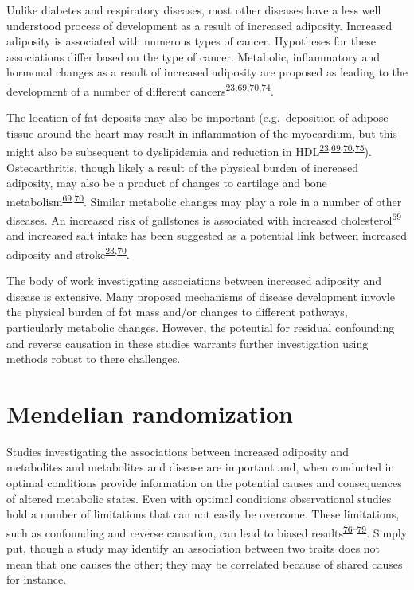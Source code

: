 \documentclass[11pt,twoside]{bristolthesis}
\begin{document}
Unlike diabetes and respiratory diseases, most other diseases have a less well understood process of development as a result of increased adiposity. Increased adiposity is associated with numerous types of cancer. Hypotheses for these associations differ based on the type of cancer. Metabolic, inflammatory and hormonal changes as a result of increased adiposity are proposed as leading to the development of a number of different cancers\textsuperscript{\protect\hyperlink{ref-Collaboration2009}{23},\protect\hyperlink{ref-Bray2004}{69},\protect\hyperlink{ref-Haslam2005}{70},\protect\hyperlink{ref-Bhaskaran2014}{74}}.

The location of fat deposits may also be important (e.g.~deposition of adipose tissue around the heart may result in inflammation of the myocardium, but this might also be subsequent to dyslipidemia and reduction in HDL\textsuperscript{\protect\hyperlink{ref-Collaboration2009}{23},\protect\hyperlink{ref-Bray2004}{69},\protect\hyperlink{ref-Haslam2005}{70},\protect\hyperlink{ref-Dagfinn2016}{75}}). Osteoarthritis, though likely a result of the physical burden of increased adiposity, may also be a product of changes to cartilage and bone metabolism\textsuperscript{\protect\hyperlink{ref-Bray2004}{69},\protect\hyperlink{ref-Haslam2005}{70}}. Similar metabolic changes may play a role in a number of other diseases. An increased risk of gallstones is associated with increased cholesterol\textsuperscript{\protect\hyperlink{ref-Bray2004}{69}} and increased salt intake has been suggested as a potential link between increased adiposity and stroke\textsuperscript{\protect\hyperlink{ref-Collaboration2009}{23},\protect\hyperlink{ref-Haslam2005}{70}}.

The body of work investigating associations between increased adiposity and disease is extensive. Many proposed mechanisms of disease development invovle the physical burden of fat mass and/or changes to different pathways, particularly metabolic changes. However, the potential for residual confounding and reverse causation in these studies warrants further investigation using methods robust to there challenges.

\hypertarget{mendelian-randomization}{%
\section{Mendelian randomization}\label{mendelian-randomization}}

Studies investigating the associations between increased adiposity and metabolites and metabolites and disease are important and, when conducted in optimal conditions provide information on the potential causes and consequences of altered metabolic states. Even with optimal conditions observational studies hold a number of limitations that can not easily be overcome. These limitations, such as confounding and reverse causation, can lead to biased results\textsuperscript{\protect\hyperlink{ref-DaveySmith2014}{76}--\protect\hyperlink{ref-Yarmolinsky2018}{79}}. Simply put, though a study may identify an association between two traits does not mean that one causes the other; they may be correlated because of shared causes for instance.
\end{document}
